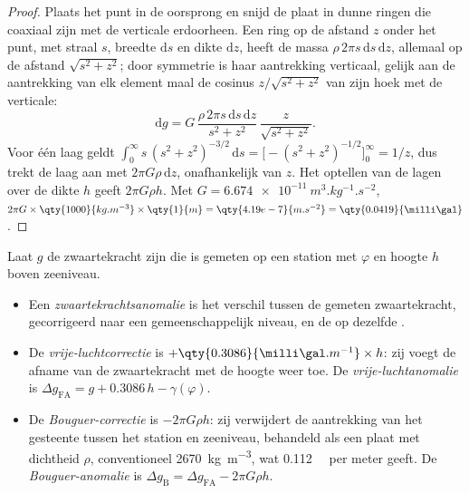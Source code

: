 \begin{proof}
Plaats het punt in de oorsprong en snijd de plaat in dunne ringen die coaxiaal zijn met de verticale erdoorheen. Een ring op de afstand $z$ onder het punt, met straal $s$, breedte $\mathrm ds$ en dikte $\mathrm dz$, heeft de massa $\rho\,2\pi s\,\mathrm ds\,\mathrm dz$, allemaal op de afstand $\sqrt{s^2 + z^2}$; door symmetrie is haar aantrekking verticaal, gelijk aan de aantrekking van elk element maal de cosinus $z/\sqrt{s^2+z^2}$ van zijn hoek met de verticale:
\[
  \mathrm dg = G\,\frac{\rho\,2\pi s\,\mathrm ds\,\mathrm dz}{s^2 + z^2}\,
  \frac{z}{\sqrt{s^2 + z^2}} .
\]
Voor één laag geldt $\int_0^\infty s\,(s^2 + z^2)^{-3/2}\,\mathrm ds =
\bigl[-(s^2 + z^2)^{-1/2}\bigr]_0^\infty = 1/z$, dus trekt de laag aan met
$2\pi G\rho\,\mathrm dz$, onafhankelijk van $z$. Het optellen van de lagen over de dikte $h$ geeft $2\pi G\rho h$. Met $G = \qty{6.674e-11}{m^3.kg^{-1}.s^{-2}}$,
$2\pi G\times\qty{1000}{kg.m^{-3}}\times\qty{1}{m} = \qty{4.19e-7}{m.s^{-2}} =
\qty{0.0419}{\milli\gal}$.
\end{proof}

\begin{definition}[Zwaartekrachtsanomalieën]\label{def:b1:isostasy-gravity:anomalies}
Laat $g$ de zwaartekracht zijn die is gemeten op een station met  $\varphi$ en hoogte $h$ boven zeeniveau.
\begin{itemize}
  \item Een \emph{zwaartekrachtsanomalie} is het verschil tussen de gemeten zwaartekracht, gecorrigeerd naar een gemeenschappelijk niveau, en de  op dezelfde .
  \item De \emph{vrije-luchtcorrectie} is
        $+\qty{0.3086}{\milli\gal.m^{-1}}\times h$: zij voegt de afname van de zwaartekracht met de hoogte weer toe. De \emph{vrije-luchtanomalie} is
        $\Delta g_{\mathrm{FA}} = g + 0.3086\,h - \gamma(\varphi)$.
  \item De \emph{Bouguer-correctie} is $-2\pi G\rho h$:
        zij verwijdert de aantrekking van het gesteente tussen het station en zeeniveau, behandeld als een plaat met dichtheid $\rho$, conventioneel \qty{2670}{kg.m^{-3}}, wat \qty{0.112}{\milli\gal} per meter geeft. De \emph{Bouguer-anomalie} is $\Delta g_{\mathrm B} = \Delta g_{\mathrm{FA}} - 2\pi G\rho h$.
\end{itemize}
\end{definition}

